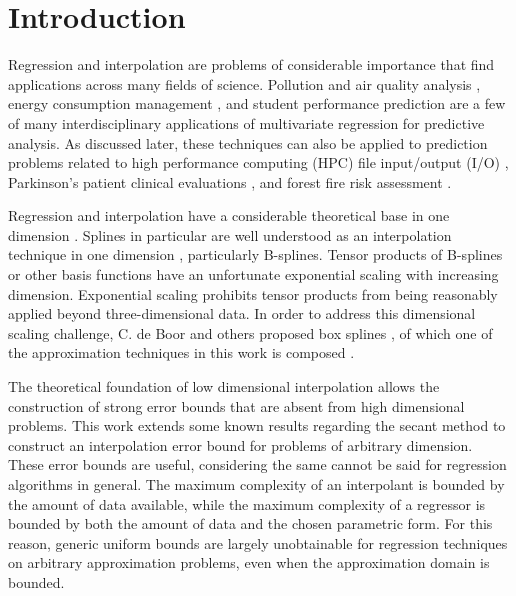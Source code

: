 \documentclass[smallextended]{svjour3}       %
\begin{document}
\section{Introduction}
\label{sec:introduction}

Regression and interpolation are problems of considerable importance that find applications across many fields of science. Pollution and air quality analysis \cite{de2008field}, energy consumption management \cite{lazos2014optimisation}, and student performance prediction \cite{cortez2008using,lux2016applications} are a few of many interdisciplinary applications of multivariate regression for predictive analysis. As discussed later, these techniques can also be applied to prediction problems related to high performance computing (HPC) file input/output (I/O) \cite{lux2018nonparametric}, Parkinson's patient clinical evaluations \cite{tsanas2010accurate}, and forest fire risk assessment \cite{cortez2007data}.

Regression and interpolation have a considerable theoretical base in one dimension \cite{cheney2009course}. Splines in particular are well understood as an interpolation technique in one dimension \cite{de1978practical}, particularly B-splines. Tensor products of B-splines \cite{unther1996interpolating} or other basis functions have an unfortunate exponential scaling with increasing dimension. Exponential scaling prohibits tensor products from being reasonably applied beyond three-dimensional data. In order to address this dimensional scaling challenge, C. de Boor and others proposed box splines \cite{de2013box}, of which one of the approximation techniques in this work is composed \cite{lux2018novel}.

The theoretical foundation of low dimensional interpolation allows the construction of strong error bounds that are absent from high dimensional problems. This work extends some known results regarding the secant method \cite{dennis1996numerical} to construct an interpolation error bound for problems of arbitrary dimension. These error bounds are useful, considering the same cannot be said for regression algorithms in general. The maximum complexity of an interpolant is bounded by the amount of data available, while the maximum complexity of a regressor is bounded by both the amount of data and the chosen parametric form. For this reason, generic uniform bounds are largely unobtainable for regression techniques on arbitrary approximation problems, even when the approximation domain is bounded.
\end{document}
